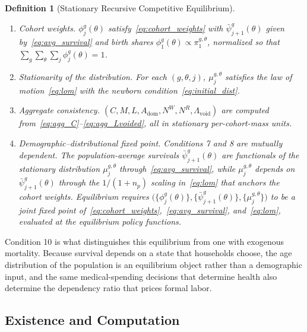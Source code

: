 \documentclass[12pt,a4paper]{article}
\newtheorem{definition}{Definition}
\begin{document}
\begin{definition}[Stationary Recursive Competitive Equilibrium]
\begin{enumerate}
\item \emph{Cohort weights.} $\phi_{j}^{g}(\theta)$ satisfy~\eqref{eq:cohort_weights} with $\bar\psi_{j+1}^{g}(\theta)$ given by~\eqref{eq:avg_survival} and birth shares $\phi_1^{g}(\theta) \propto \pi^{g,\theta}_1$, normalized so that $\sum_g \sum_\theta \sum_j \phi_j^{g}(\theta) = 1$.
\item \emph{Stationarity of the distribution.} For each $(g, \theta, j)$, $\mu_j^{g,\theta}$ satisfies the law of motion~\eqref{eq:lom} with the newborn condition~\eqref{eq:initial_dist}.
\item \emph{Aggregate consistency.} $(C, M, L, A_{\mathrm{dom}}, N^W, N^R, \Lambda_{\mathrm{void}})$ are computed from~\eqref{eq:agg_C}--\eqref{eq:agg_Lvoided}, all in stationary per-cohort-mass units.
\item \emph{Demographic--distributional fixed point.} Conditions 7 and 8 are mutually dependent. The population-average survivals $\bar\psi^{g}_{j+1}(\theta)$ are functionals of the stationary distribution $\mu^{g,\theta}_j$ through~\eqref{eq:avg_survival}, while $\mu^{g,\theta}_j$ depends on $\bar\psi^{g}_{j+1}(\theta)$ through the $1/(1+n_p)$ scaling in~\eqref{eq:lom} that anchors the cohort weights. Equilibrium requires $\bigl(\{\phi^{g}_j(\theta)\}, \{\bar\psi^{g}_{j+1}(\theta)\}, \{\mu^{g,\theta}_j\}\bigr)$ to be a joint fixed point of~\eqref{eq:cohort_weights},~\eqref{eq:avg_survival}, and~\eqref{eq:lom}, evaluated at the equilibrium policy functions.
\end{enumerate}
\end{definition}

Condition 10 is what distinguishes this equilibrium from one with exogenous mortality. Because survival depends on a state that households choose, the age distribution of the population is an equilibrium object rather than a demographic input, and the same medical-spending decisions that determine health also determine the dependency ratio that prices formal labor.

\subsection{Existence and Computation}
\label{subsec:existence}
\end{document}
